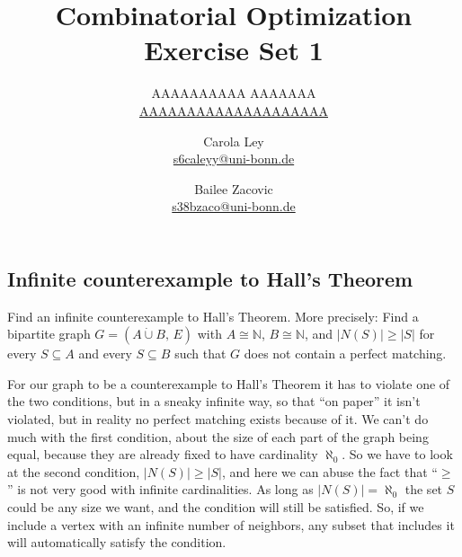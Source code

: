 \documentclass{article}
\title{Combinatorial Optimization \\ Exercise Set 1}
\author{
  AAAAAAAAAA AAAAAAA \\
  \href{mailto:AAAAAAAAAAAAAAAAAAAA}{AAAAAAAAAAAAAAAAAAAA}
  \and
  Carola Ley \\
  \href{mailto:s6caleyy@uni-bonn.de}{s6caleyy@uni-bonn.de}
  \and
  Bailee Zacovic \\
  \href{mailto:s38bzaco@uni-bonn.de}{s38bzaco@uni-bonn.de}
}
\newcommand{\N}{\mathbb{N}}
\begin{document}
  \maketitle

  \setcounter{section}{1}
  \subsection{Infinite counterexample to Hall's Theorem}
  \begin{centerframebox}
    Find an infinite counterexample to Hall's Theorem. More precisely:
    Find a bipartite graph $G = (A \dot\cup B,\, E)$ with $A \cong \N$, $B \cong \N$, and $|N(S)| \geq |S|$ for
    every $S \subseteq A$ and every $S \subseteq B$ such that $G$ does not contain a perfect matching.
  \end{centerframebox}

  For our graph to be a counterexample to Hall's Theorem it has to violate one of the two conditions,
  but in a sneaky infinite way, so that ``on paper'' it isn't violated, but in reality no perfect matching exists because of it.
  We can't do much with the first condition, about the size of each part of the graph being equal,
  because they are already fixed to have cardinality $\aleph_0$.
  So we have to look at the second condition, $|N(S)| \geq |S|$,
  and here we can abuse the fact that ``$\geq$'' is not very good with infinite cardinalities.
  As long as $|N(S)| = \aleph_0$ the set $S$ could be any size we want, and the condition will still be satisfied.
  So, if we include a vertex with an infinite number of neighbors, any subset that includes it will automatically satisfy the condition.

  \begin{center}
  \end{center}
\end{document}
